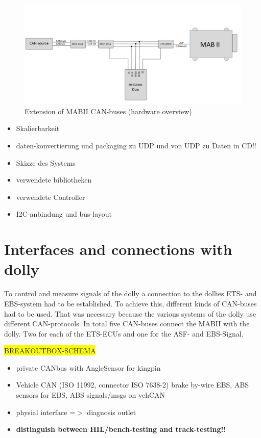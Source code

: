 \documentclass[ExampleMasters.tex]{subfiles}
\begin{document}
\begin{figure}[h]
\centering
\includegraphics[width=1\linewidth]{figures/can_extension}
\caption{Extension of MABII CAN-buses (hardware overview)}
\label{fig:can_extension}
\end{figure}


\begin{itemize}
	\item Skalierbarkeit
	\item daten-konvertierung und packaging zu UDP und von UDP zu Daten in CD!!
	\item Skizze des Systems
	\item verwendete bibliotheken
	\item verwendete Controller
	\item I2C-anbindung und bus-layout
\end{itemize}

\section{Interfaces and connections with dolly}
\label{sec:interface_with_dolly}
To control and measure signals of the dolly a connection to the dollies ETS- and EBS-system had to be established. To achieve this, different kinds of CAN-buses had to be used. That was necessary because the various systems of the dolly use different CAN-protocols. In total five CAN-buses connect the MABII with the dolly. Two for each of the ETS-ECUs and one for the ASF- and EBS-Signal.

\colorbox{yellow}{BREAKOUTBOX-SCHEMA}
 
\begin{itemize}
	\item private CANbus with AngleSensor for kingpin
	\item Vehicle CAN (ISO 11992, connector ISO 7638-2)
	\subitem brake by-wire
	\subitem EBS, ABS
	\subitem sensors for EBS, ABS
	\subitem signals/msgs on vehCAN
	\item physial interface =$>$ diagnosis outlet
	\item \textbf{distinguish between HIL/bench-testing and track-testing!!}
\end{itemize}
\end{document}
